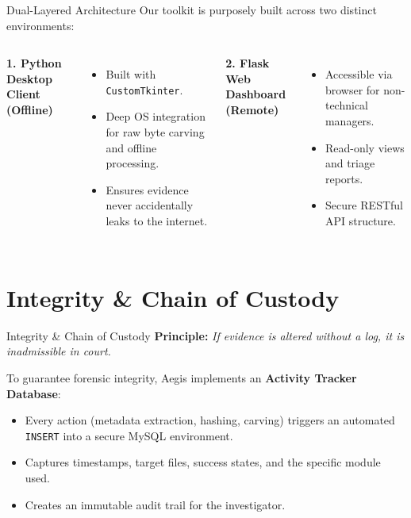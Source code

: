 \documentclass[aspectratio=169]{beamer}
\begin{document}
\begin{frame}{Dual-Layered Architecture}
    Our toolkit is purposely built across two distinct environments:
    
    \vspace{0.3cm}
    \begin{columns}
        \textbf{1. Python Desktop Client (Offline)}
        \begin{itemize}
            \item Built with \texttt{CustomTkinter}.
            \item Deep OS integration for raw byte carving and offline processing.
            \item Ensures evidence never accidentally leaks to the internet.
        \end{itemize}
        
        \textbf{2. Flask Web Dashboard (Remote)}
        \begin{itemize}
            \item Accessible via browser for non-technical managers.
            \item Read-only views and triage reports.
            \item Secure RESTful API structure.
        \end{itemize}
    \end{columns}
\end{frame}

\section{Integrity \& Chain of Custody}

\begin{frame}{Integrity \& Chain of Custody}
    \textbf{Principle:} \textit{If evidence is altered without a log, it is inadmissible in court.}
    
    \vspace{0.5cm}
    To guarantee forensic integrity, Aegis implements an \textbf{Activity Tracker Database}:
    \begin{itemize}
        \item Every action (metadata extraction, hashing, carving) triggers an automated \texttt{INSERT} into a secure MySQL environment.
        \item Captures timestamps, target files, success states, and the specific module used.
        \item Creates an immutable audit trail for the investigator.
    \end{itemize}
\end{frame}
\end{document}
